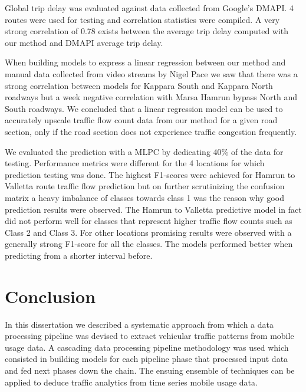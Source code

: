 \documentclass[12pt, a4paper]{report}
\theoremstyle{definition}
\theoremstyle{definition}%
\theoremstyle{definition}%
\theoremstyle{definition}%
\theoremstyle{definition}%
\theoremstyle{definition}%
\begin{document}
Global trip delay was evaluated against data collected from Google's DMAPI. 4 routes were used for testing and correlation statistics were compiled. A very strong correlation of 0.78 exists between the average trip delay computed with our method and DMAPI average trip delay. 

When building models to express a linear regression between our method and manual data collected from video streams by Nigel Pace we saw that there was a strong correlation between models for Kappara South and Kappara North roadways but a week negative correlation with Marsa Hamrun bypass North and South roadways. We concluded that a linear regression model can be used to accurately upscale traffic flow count data from our method for a given road section, only if the road section does not experience traffic congestion frequently.

We evaluated the prediction with a MLPC by dedicating 40\% of the data for testing. Performance metrics were different for the 4 locations for which prediction testing was done. The highest F1-scores were achieved for Hamrun to Valletta route traffic flow prediction but on further scrutinizing the confusion matrix a heavy imbalance of classes towards class 1 was the reason why good prediction results were observed. The Hamrun to Valletta predictive model in fact did not perform well for classes that represent higher traffic flow counts such as Class 2 and Class 3. For other locations promising results were observed with a generally strong F1-score for all the classes. The models performed better when predicting from a shorter interval before. 



\chapter{Conclusion} \label{chapter:conclusion}

In this dissertation we described a systematic approach from which a data processing pipeline was devised to extract vehicular traffic patterns from mobile usage data. A cascading data processing pipeline methodology was used which consisted in building models for each pipeline phase that processed input data and fed next phases down the chain. The ensuing ensemble of techniques can be applied to deduce traffic analytics from time series mobile usage data. 
\end{document}
